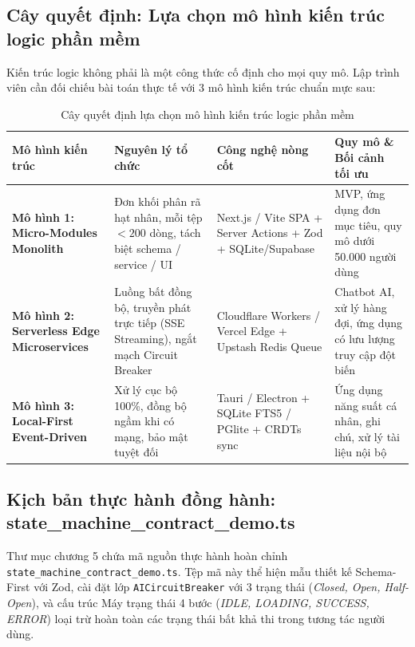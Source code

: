 \documentclass[a4paper,11pt]{article}
\begin{document}
\subsection{Cây quyết định: Lựa chọn mô hình kiến trúc logic phần mềm}

Kiến trúc logic không phải là một công thức cố định cho mọi quy mô. Lập trình viên cần đối chiếu bài toán thực tế với 3 mô hình kiến trúc chuẩn mực sau:

\begin{table}[htbp]
\centering
\small
\caption{Cây quyết định lựa chọn mô hình kiến trúc logic phần mềm}
\vspace{0.5em}
\begin{tabularx}{\textwidth}{L{3.2cm} L{3.8cm} L{4.5cm} Y}
\toprule
\textbf{Mô hình kiến trúc} & \textbf{Nguyên lý tổ chức} & \textbf{Công nghệ nòng cốt} & \textbf{Quy mô \& Bối cảnh tối ưu} \\
\midrule
\textbf{Mô hình 1: Micro-Modules Monolith} & Đơn khối phân rã hạt nhân, mỗi tệp $< 200$ dòng, tách biệt schema / service / UI & Next.js / Vite SPA + Server Actions + Zod + SQLite/Supabase & MVP, ứng dụng đơn mục tiêu, quy mô dưới 50.000 người dùng \\
\textbf{Mô hình 2: Serverless Edge Microservices} & Luồng bất đồng bộ, truyền phát trực tiếp (SSE Streaming), ngắt mạch Circuit Breaker & Cloudflare Workers / Vercel Edge + Upstash Redis Queue & Chatbot AI, xử lý hàng đợi, ứng dụng có lưu lượng truy cập đột biến \\
\textbf{Mô hình 3: Local-First Event-Driven} & Xử lý cục bộ 100\%, đồng bộ ngầm khi có mạng, bảo mật tuyệt đối & Tauri / Electron + SQLite FTS5 / PGlite + CRDTs sync & Ứng dụng năng suất cá nhân, ghi chú, xử lý tài liệu nội bộ \\
\bottomrule
\end{tabularx}
\end{table}

\subsection{Kịch bản thực hành đồng hành: state\_machine\_contract\_demo.ts}
Thư mục chương 5 chứa mã nguồn thực hành hoàn chỉnh \texttt{state\_machine\_contract\_demo.ts}. Tệp mã này thể hiện mẫu thiết kế Schema-First với Zod, cài đặt lớp \texttt{AICircuitBreaker} với 3 trạng thái (\textit{Closed, Open, Half-Open}), và cấu trúc Máy trạng thái 4 bước (\textit{IDLE, LOADING, SUCCESS, ERROR}) loại trừ hoàn toàn các trạng thái bất khả thi trong tương tác người dùng.
\end{document}
